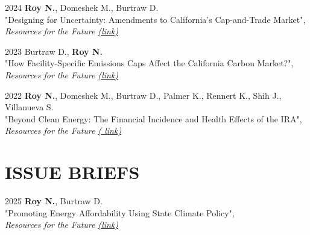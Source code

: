 \documentclass[margin]{res}
\begin{document}
\begin{resume}
2024 \hspace{4mm}%
\textbf{Roy N.}, Domeshek M., Burtraw D. \\
\hspace*{16mm}   "Designing for Uncertainty: Amendments to California's Cap-and-Trade Market", \\
\hspace*{16mm}   \textit{Resources for the Future \href{https://www.rff.org/publications/reports/designing-for-uncertainty-amendments-to-californias-cap-and-trade-market/}{(link)}}

2023 \hspace{4mm}%
Burtraw D., \textbf{Roy N.} \\
\hspace*{16mm}  "How Facility-Specific Emissions Caps Affect the California Carbon Market?", \\ \hspace*{16mm}  \textit{Resources for the Future \href{https://www.rff.org/publications/reports/how-would-facility-specific-emissions-caps-affect-the-california-carbon-market/}{(link)}} 
    
2022 \hspace{4mm}%
\textbf{Roy N.}, Domeshek M., Burtraw D., Palmer K., Rennert K., Shih J., Villanueva S. \\
    \hspace*{16mm} "Beyond Clean Energy: The Financial Incidence and Health Effects of the IRA", \\ 
    \hspace*{16mm} \textit{Resources for the Future \href{https://www.rff.org/publications/issue-briefs/retail-electricity-rates-under-the-inflation-reduction-act-of-2022/} {( link)} }


\section{ISSUE BRIEFS} 
2025 \hspace{4mm}%
\textbf{Roy N.}, Burtraw D. \\
    \hspace*{16mm} "Promoting Energy Affordability Using State Climate Policy",  \\
    \hspace*{16mm} \textit{Resources for the Future \href{https://www.rff.org/publications/issue-briefs/promoting-energy-affordability-using-state-climate-policy/}{(link)}}
    



\end{resume}
\end{document}

